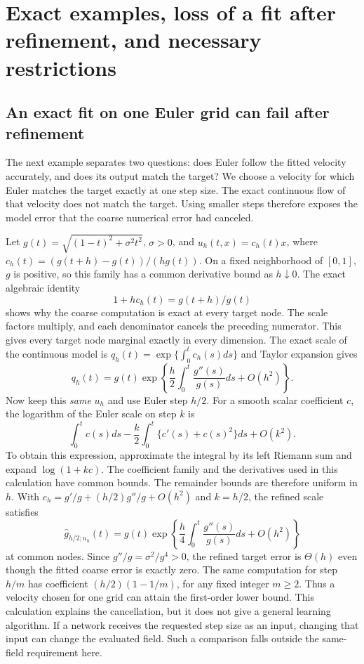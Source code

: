 \section{Exact examples, loss of a fit after refinement, and necessary restrictions}
\label{app:controls}

\subsection{An exact fit on one Euler grid can fail after refinement}
The next example separates two questions: does Euler follow the fitted
velocity accurately, and does its output match the target? We choose a
velocity for which Euler matches the target exactly at one step size.
The exact continuous flow of that velocity does not match the target.
Using smaller steps therefore exposes the model error that the coarse
numerical error had canceled.\AIassistance

Let $g(t)=\sqrt{(1-t)^2+\sigma^2t^2}$, $\sigma>0$, and
$u_h(t,x)=c_h(t)x$, where
$c_h(t)=(g(t+h)-g(t))/(h g(t))$. On a fixed neighborhood of $[0,1]$,
$g$ is positive, so this family has a common derivative bound as $h\downarrow0$.
The exact algebraic identity
\[
 1+hc_h(t)=g(t+h)/g(t)
\]
shows why the coarse computation is exact at every target node. The scale
factors multiply, and each denominator cancels the preceding numerator.
This gives every target node marginal exactly in every dimension.
The exact scale of the continuous model is
$q_h(t)=\exp\{\int_0^tc_h(s)ds\}$ and Taylor expansion gives
\begin{equation}
 q_h(t)=g(t)\exp\left\{\frac h2\int_0^t\frac{g''(s)}{g(s)}ds+O(h^2)\right\}.
 \label{eq:secant-model}
\end{equation}
Now keep this \emph{same} $u_h$ and use Euler step $h/2$. For a smooth scalar
coefficient $c$, the logarithm of the Euler scale on step $k$ is
\[
 \int_0^t c(s)ds-\frac k2\int_0^t\{c'(s)+c(s)^2\}ds+O(k^2).
\]
To obtain this expression, approximate the integral by its left Riemann
sum and expand $\log(1+kc)$. The coefficient family and the derivatives
used in this calculation have common bounds. The remainder bounds are
therefore uniform in $h$.
With $c_h=g'/g+(h/2)g''/g+O(h^2)$ and $k=h/2$, the refined scale satisfies
\begin{equation}
 \widehat g_{h/2;u_h}(t)
 =g(t)\exp\left\{\frac h4\int_0^t\frac{g''(s)}{g(s)}ds+O(h^2)\right\}
 \label{eq:secant-transfer}
\end{equation}
at common nodes. Since $g''/g=\sigma^2/g^4>0$, the refined target error
is $\Theta(h)$ even though the fitted coarse error is exactly zero.
The same computation for step $h/m$ has coefficient
$(h/2)(1-1/m)$, for any fixed integer $m\ge2$.
Thus a velocity chosen for one grid can attain the first-order lower
bound. This calculation explains the cancellation, but it does not give
a general learning algorithm. If a network receives the requested step
size as an input, changing that input can change the evaluated field.
Such a comparison falls outside the same-field requirement here.

